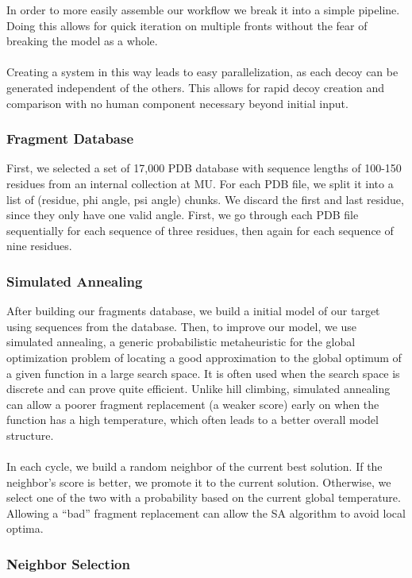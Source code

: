 \documentclass{article}
\begin{document}
In order to more easily assemble our workflow we break it into a simple pipeline. Doing this allows for quick iteration on multiple fronts without the fear of breaking the model as a whole.\\\\
Creating a system in this way leads to easy parallelization, as each decoy can be generated independent of the others. This allows for rapid decoy creation and comparison with no human component necessary beyond initial input.


\subsubsection{Fragment Database}

First, we selected a set of 17,000 PDB database with sequence lengths of 100-150 residues from an internal collection at MU.  For each PDB file, we split it into a list of (residue, phi angle, psi angle) chunks.  We discard the first and last residue, since they only have one valid angle.  First, we go through each PDB file sequentially for each sequence of three residues, then again for each sequence of nine residues.


\subsubsection{Simulated Annealing}

After building our fragments database, we build a initial model of our target using sequences from the database. Then, to improve our model, we use simulated annealing, a generic probabilistic metaheuristic for the global optimization problem of locating a good approximation to the global optimum of a given function in a large search space. It is often used when the search space is discrete and can prove quite efficient. Unlike hill climbing, simulated annealing can allow a poorer fragment replacement (a weaker score) early on when the function has a high temperature, which often leads to a better overall model structure.\\\\
In each cycle, we build a random neighbor of the current best solution. If the neighbor’s score is better, we promote it to  the current solution. Otherwise, we select one of the two with a probability based on the current global temperature.  Allowing a “bad” fragment replacement can allow the SA algorithm to avoid local optima.


\subsubsection{Neighbor Selection}
\end{document}
